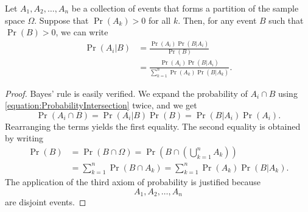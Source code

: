 \begin{theorem} 
Let $A_1, A_2, \ldots, A_n$ be a collection of events that forms a partition of the sample space $\Omega$.
Suppose that $\Pr (A_k) > 0$ for all $k$.
Then, for any event $B$ such that $\Pr (B) > 0$, we can write
\begin{equation*}
\begin{split}
\Pr (A_i | B)
&= \frac{ \Pr (A_i) \Pr (B | A_i) }{ \Pr (B) } \\
&= \frac{ \Pr (A_i) \Pr (B | A_i) }
{ \sum_{k=1}^n \Pr (A_k) \Pr (B | A_k) } .
\end{split}
\end{equation*}
\end{theorem}
\begin{proof}
Bayes' rule is easily verified.
We expand the probability of $A_i \cap B$ using \eqref{equation:ProbabilityIntersection} twice, and we get
\begin{equation*}
\Pr (A_i \cap B) = \Pr (A_i | B) \Pr (B) = \Pr (B | A_i) \Pr (A_i).
\end{equation*}
Rearranging the terms yields the first equality.
The second equality is obtained by writing
\begin{equation*}
\begin{split}
\Pr (B) &= \Pr (B \cap \Omega)
= \Pr \left( B \cap \left( \bigcup_{k=1}^n A_k \right) \right) \\
&= \sum_{k=1}^n \Pr (B \cap A_k)
= \sum_{k=1}^n \Pr (A_k) \Pr (B | A_k) .
\end{split}
\end{equation*}
The application of the third axiom of probability is justified because
\begin{equation*}
A_1, A_2, \ldots, A_n
\end{equation*}
are disjoint events.
\end{proof}

